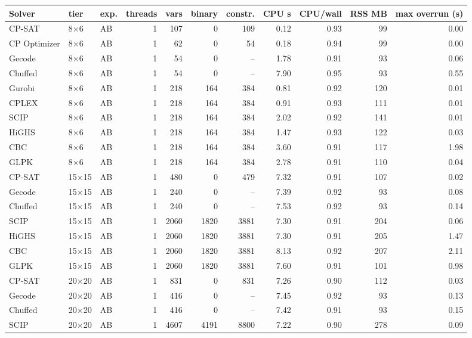 \begin{tabular}{lllrrrrrrrr}
\toprule
Solver & tier & exp. & threads & vars & binary & constr. & CPU s & CPU/wall & RSS MB & max overrun (s) \\
\midrule
CP-SAT & 8$\times$6 & AB & 1 & 107 & 0 & 109 & 0.12 & 0.93 & 99 & 0.00 \\
CP Optimizer & 8$\times$6 & AB & 1 & 62 & 0 & 54 & 0.18 & 0.94 & 99 & 0.00 \\
Gecode & 8$\times$6 & AB & 1 & 54 & 0 & -- & 1.78 & 0.91 & 93 & 0.06 \\
Chuffed & 8$\times$6 & AB & 1 & 54 & 0 & -- & 7.90 & 0.95 & 93 & 0.55 \\
Gurobi & 8$\times$6 & AB & 1 & 218 & 164 & 384 & 0.81 & 0.92 & 120 & 0.01 \\
CPLEX & 8$\times$6 & AB & 1 & 218 & 164 & 384 & 0.91 & 0.93 & 111 & 0.01 \\
SCIP & 8$\times$6 & AB & 1 & 218 & 164 & 384 & 2.02 & 0.92 & 141 & 0.01 \\
HiGHS & 8$\times$6 & AB & 1 & 218 & 164 & 384 & 1.47 & 0.93 & 122 & 0.03 \\
CBC & 8$\times$6 & AB & 1 & 218 & 164 & 384 & 3.60 & 0.91 & 117 & 1.98 \\
GLPK & 8$\times$6 & AB & 1 & 218 & 164 & 384 & 2.78 & 0.91 & 110 & 0.04 \\
CP-SAT & 15$\times$15 & AB & 1 & 480 & 0 & 479 & 7.32 & 0.91 & 107 & 0.02 \\
Gecode & 15$\times$15 & AB & 1 & 240 & 0 & -- & 7.39 & 0.92 & 93 & 0.08 \\
Chuffed & 15$\times$15 & AB & 1 & 240 & 0 & -- & 7.53 & 0.92 & 93 & 0.14 \\
SCIP & 15$\times$15 & AB & 1 & 2060 & 1820 & 3881 & 7.30 & 0.91 & 204 & 0.06 \\
HiGHS & 15$\times$15 & AB & 1 & 2060 & 1820 & 3881 & 7.30 & 0.91 & 205 & 1.47 \\
CBC & 15$\times$15 & AB & 1 & 2060 & 1820 & 3881 & 8.13 & 0.92 & 207 & 2.11 \\
GLPK & 15$\times$15 & AB & 1 & 2060 & 1820 & 3881 & 7.60 & 0.91 & 101 & 0.98 \\
CP-SAT & 20$\times$20 & AB & 1 & 831 & 0 & 831 & 7.26 & 0.90 & 112 & 0.03 \\
Gecode & 20$\times$20 & AB & 1 & 416 & 0 & -- & 7.45 & 0.92 & 93 & 0.13 \\
Chuffed & 20$\times$20 & AB & 1 & 416 & 0 & -- & 7.42 & 0.91 & 93 & 0.15 \\
SCIP & 20$\times$20 & AB & 1 & 4607 & 4191 & 8800 & 7.22 & 0.90 & 278 & 0.09 \\

\end{tabular}
